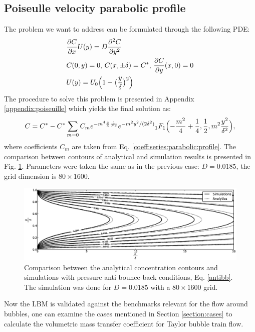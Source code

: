 \documentclass{article}
\newcommand{\beq}{\begin{equation}}
\newcommand{\feq}{\end{equation}}
\newcommand{\cstar}{C^{*}}
\begin{document}
\subsection{Poiseulle velocity parabolic profile}
The problem we want to address can be formulated through the following PDE:
\beq
\begin{aligned}
&\frac{\partial C}{\partial x} U(y)=D\frac{\partial^2 C}{\partial y^2}\\
&C(0,y)=0,\, C(x,\pm \delta)=\cstar,\, \frac{\partial C}{\partial y }(x,0)=0\\
&U(y)=U_0 \Bigl(1-\bigl(\frac{y}{\delta}\bigr)^2\Bigr)
\end{aligned}
\feq
The procedure to solve this problem is presented in Appendix \ref{appendix:poiseuille} which yields
the final solution as:
\begin{equation}
C=\cstar-\cstar \sum_{m=0}{C_m e^{-m^4 \frac{x}{\delta}\frac{1}{Pe}} e^{-m^2
y^2/(2\delta^2)}{_1F_1}\Bigl(-\frac{m^2}{4}+\frac{1}{4},\frac{1}{2},m^2 \frac{y^2}{\delta^2}\Bigr)},
\end{equation}
where coefficients $C_m$ are taken from Eq. \ref{coeff:series:parabolic:profile}. The comparison
between contours of analytical and simulation results is presented in Fig.
\ref{fig:parabolic:comparison}. Parameters were taken the  same as in the previous case: $D=0.0185$, the grid dimension is $80\times1600$. 
\begin{figure}[htb!]
\includegraphics[width=\textwidth]{Figures/parabolic_profile_comparison.eps}
\caption{Comparison between the analytical concentration contours and simulations with pressure
anti bounce-back conditions, Eq. \ref{antibb}. The simulation was done for $D=0.0185$ with a
$80\times1600$ grid. \label{fig:parabolic:comparison}}
\end{figure}

Now the LBM is validated against the benchmarks relevant for the flow around bubbles, one can
examine the cases mentioned in Section
\ref{section:cases} to calculate the volumetric mass transfer coefficient for Taylor bubble train flow.
\end{document}
